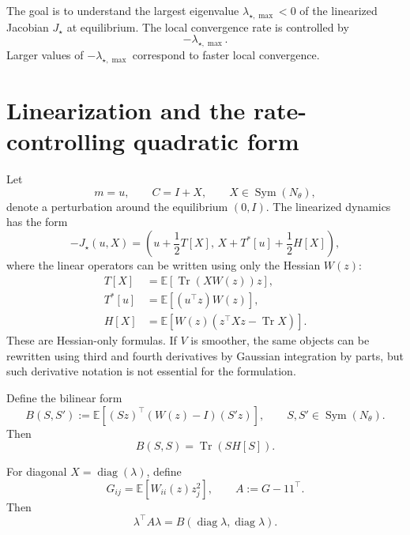 \documentclass[11pt]{article}
\numberwithin{equation}{section}
\DeclareMathOperator{\Tr}{Tr}
\DeclareMathOperator{\Sym}{Sym}
\DeclareMathOperator{\diag}{diag}
\begin{document}
The goal is to understand the largest eigenvalue $\lambda_{\star,\max}<0$ of the linearized Jacobian $J_\star$ at equilibrium. 
The local convergence rate is controlled by
\begin{equation}
    -\lambda_{\star,\max}.
\end{equation}
Larger values of $-\lambda_{\star,\max}$ correspond to faster local convergence.

\section{Linearization and the rate-controlling quadratic form}

Let
\begin{equation}
    m=u,
    \qquad
    C=I+X,
    \qquad
    X\in \Sym(N_\theta),
\end{equation}
denote a perturbation around the equilibrium $(0,I)$. 
The linearized dynamics has the form
\begin{equation}
    -J_\star(u,X)
    =
    \left(
    u+\frac12 T[X],
    \,
    X+T^\ast[u]+\frac12 H[X]
    \right),
\end{equation}
where the linear operators can be written using only the Hessian $W(z)$:
\begin{align}
    T[X]
    &=
    \mathbb E
    \left[
    \Tr(XW(z))z
    \right],
    \\
    T^\ast[u]
    &=
    \mathbb E
    \left[
    (u^\top z)W(z)
    \right],
    \\
    H[X]
    &=
    \mathbb E
    \left[
    W(z)\left(z^\top Xz-\Tr X\right)
    \right].
\end{align}
These are Hessian-only formulas. 
If $V$ is smoother, the same objects can be rewritten using third and fourth derivatives by Gaussian integration by parts, but such derivative notation is not essential for the formulation.

Define the bilinear form
\begin{equation}
    B(S,S')
    :=
    \mathbb E
    \left[
    (Sz)^\top (W(z)-I)(S'z)
    \right],
    \qquad
    S,S'\in \Sym(N_\theta).
\end{equation}
Then
\begin{equation}
    B(S,S)
    =
    \Tr(SH[S]).
\end{equation}

For diagonal $X=\diag(\lambda)$, define
\begin{equation}
    G_{ij}
    =
    \mathbb E[W_{ii}(z)z_j^2],
    \qquad
    A:=G-11^\top.
\end{equation}
Then
\begin{equation}
    \lambda^\top A\lambda
    =
    B(\diag\lambda,\diag\lambda).
\end{equation}
\end{document}
